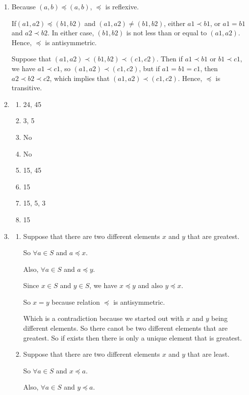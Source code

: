 \documentclass{../../cls/sig-alternate-05-2015}
\begin{document}
\begin{enumerate}
\item 
Because $(a, b)\preceq (a, b)$, $\preceq$ is reflexive. 

If$(a1, a2)\preceq (b1, b2)$ and $(a1, a2)\neq (b1, b2)$, either $a1\prec b1$, or
$a1 = b1$ and $a2 \prec b2$. In either case, $(b1, b2)$ is not less than or
equal to $(a1, a2)$. Hence, $\preceq$ is antisymmetric. 

Suppose that
$(a1, a2)\prec (b1, b2) \prec (c1, c2)$. Then if $a1\prec b1$ or $b1\prec c1$,
we have $a1 \prec c1$, so $(a1, a2) \prec (c1, c2)$, but if $a1 = b1 = c1$,
then $a2 \prec b2 \prec c2$, which implies that $(a1, a2) \prec (c1, c2)$.
Hence, $\preceq$ is transitive.

\item
\begin{enumerate}
	\item 24, 45 
	\item 3, 5
	\item No
	\item No
	\item 15, 45
	\item 15
	\item 15, 5, 3
	\item 15
\end{enumerate}

\item
	\begin{enumerate}
		\item Suppose that there are two different elements $x$ and $y$ that are greatest.
		
		So $\forall a \in S$ and $a\preceq x$. 
		
		Also, $\forall a \in S$ and $a\preceq y$. 
		
		Since $x \in S$ and $y\in S$, we have $x\preceq y$ and also $y \preceq x$. 
		
		So $x=y$ because relation $\preceq$ is antisymmetric.
		
		Which is a contradiction because we started out with $x$ and $y$ being different
		elements. So there canot be two different elements that are greatest. So if
		exists then there is only a unique element that is greatest.

		\item Suppose that there are two different elements $x$ and $y$ that are least.
		
		So $\forall a \in S$ and $x\preceq a$. 
		
		Also, $\forall a \in S$ and $y\preceq a$. 
		

\end{enumerate}
\end{enumerate}
\end{document}
